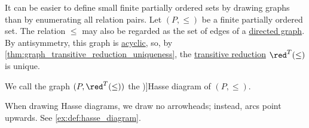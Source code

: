 \begin{definition}\label{def:hasse_diagram}
  It can be easier to define small finite partially ordered sets by drawing graphs than by enumerating all relation pairs. Let \( (P, \leq) \) be a finite partially ordered set. The relation \( \leq \) may also be regarded as the set of edges of a \hyperref[def:directed_graph]{directed graph}. By antisymmetry, this graph is \hyperref[def:acyclic_graph]{acyclic}, so, by \cref{thm:graph_transitive_reduction_uniqueness}, the \hyperref[def:directed_graph_transitive_reduction]{transitive reduction} \( \red^T(\leq) \) is unique.

  We call the graph \( (P, \red^T(\leq)) \) the \term[ru=диаграмма Хассе (\cite[78]{Гуров2013ТеорияРешёток})]{Hasse diagram} of \( (P, \leq) \).
\end{definition}
\begin{comments}
  \item When drawing Hasse diagrams, we draw no arrowheads; instead, arcs point upwards. See \cref{ex:def:hasse_diagram}.
\end{comments}

